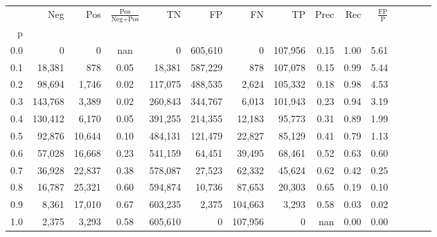 \begin{tabular}{rrrcrrrrrrrrrrr}
\toprule
{} &      Neg &     Pos & $\frac{\text{Pos}}{\text{Neg}+\text{Pos}}$ &       TN &       FP &       FN &       TP &  Prec &   Rec & $\frac{\text{FP}}{\text{P}}$ \\
p   &          &         &                                            &          &          &          &          &       &       &                              \\
\midrule
0.0 &        0 &       0 &                                        nan &        0 &  605,610 &        0 &  107,956 &  0.15 &  1.00 &                         5.61 \\
0.1 &   18,381 &     878 &                                       0.05 &   18,381 &  587,229 &      878 &  107,078 &  0.15 &  0.99 &                         5.44 \\
0.2 &   98,694 &   1,746 &                                       0.02 &  117,075 &  488,535 &    2,624 &  105,332 &  0.18 &  0.98 &                         4.53 \\
0.3 &  143,768 &   3,389 &                                       0.02 &  260,843 &  344,767 &    6,013 &  101,943 &  0.23 &  0.94 &                         3.19 \\
0.4 &  130,412 &   6,170 &                                       0.05 &  391,255 &  214,355 &   12,183 &   95,773 &  0.31 &  0.89 &                         1.99 \\
0.5 &   92,876 &  10,644 &                                       0.10 &  484,131 &  121,479 &   22,827 &   85,129 &  0.41 &  0.79 &                         1.13 \\
0.6 &   57,028 &  16,668 &                                       0.23 &  541,159 &   64,451 &   39,495 &   68,461 &  0.52 &  0.63 &                         0.60 \\
0.7 &   36,928 &  22,837 &                                       0.38 &  578,087 &   27,523 &   62,332 &   45,624 &  0.62 &  0.42 &                         0.25 \\
0.8 &   16,787 &  25,321 &                                       0.60 &  594,874 &   10,736 &   87,653 &   20,303 &  0.65 &  0.19 &                         0.10 \\
0.9 &    8,361 &  17,010 &                                       0.67 &  603,235 &    2,375 &  104,663 &    3,293 &  0.58 &  0.03 &                         0.02 \\
1.0 &    2,375 &   3,293 &                                       0.58 &  605,610 &        0 &  107,956 &        0 &   nan &  0.00 &                         0.00 \\
\bottomrule
\end{tabular}
